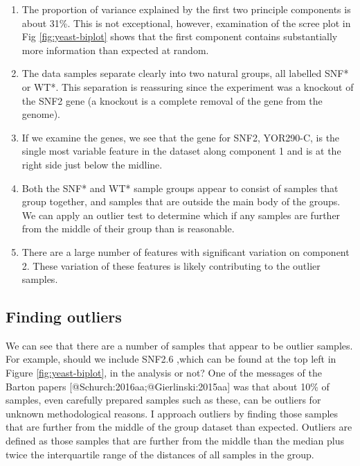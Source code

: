 \documentclass[
  onecolumn]{article}
\providecommand{\tightlist}{%
  \setlength{\itemsep}{0pt}\setlength{\parskip}{0pt}}
\begin{document}
\begin{enumerate}
\def\labelenumi{\arabic{enumi})}
\tightlist
\item
  The proportion of variance explained by the first two principle components is about 31\%. This is not exceptional, however, examination of the scree plot in Fig \ref{fig:yeast-biplot} shows that the first component contains substantially more information than expected at random.
\item
  The data samples separate clearly into two natural groups, all labelled SNF* or WT*. This separation is reassuring since the experiment was a knockout of the SNF2 gene (a knockout is a complete removal of the gene from the genome).
\item
  If we examine the genes, we see that the gene for SNF2, YOR290-C, is the single most variable feature in the dataset along component 1 and is at the right side just below the midline.
\item
  Both the SNF* and WT* sample groups appear to consist of samples that group together, and samples that are outside the main body of the groups. We can apply an outlier test to determine which if any samples are further from the middle of their group than is reasonable.
\item
  There are a large number of features with significant variation on component 2. These variation of these features is likely contributing to the outlier samples.
\end{enumerate}

\hypertarget{finding-outliers}{%
\subsection{Finding outliers}\label{finding-outliers}}

We can see that there are a number of samples that appear to be outlier samples. For example, should we include SNF2.6 ,which can be found at the top left in Figure \ref{fig:yeast-biplot}, in the analysis or not? One of the messages of the Barton papers {[}@Schurch:2016aa;@Gierlinski:2015aa{]} was that about 10\% of samples, even carefully prepared samples such as these, can be outliers for unknown methodological reasons. I approach outliers by finding those samples that are further from the middle of the group dataset than expected. Outliers are defined as those samples that are further from the middle than the median plus twice the interquartile range of the distances of all samples in the group.
\end{document}
